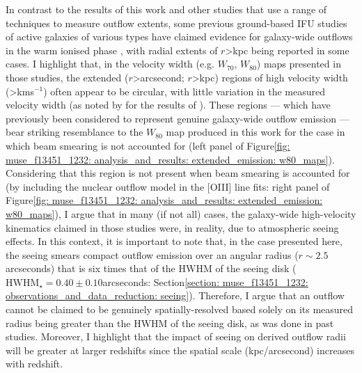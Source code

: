 In contrast to the results of this work and other studies that use a range of techniques to measure outflow extents, some previous ground-based IFU studies of active galaxies of various types have claimed evidence for galaxy-wide outflows in the warm ionised phase \citep{Liu2013, Liu2014, Harrison2014, McElroy2015}, with radial extents of $r$\;\textgreater{}\;kpc being reported in some cases. I highlight that, in the velocity width (e.g. $W_\mathrm{70}$, $W_\mathrm{80}$) maps presented in those studies, the extended ($r$\;\textgreater{}\;arcsecond; $r$\;\textgreater{}\;kpc) regions of high velocity width (\textgreater{}\;km\;s$^{-1}$) often appear to be circular, with little variation in the measured velocity width (as noted by \citealt{Husemann2016} for the results of \citealt{Liu2013, Liu2014}). These regions --- which have previously been considered to represent genuine galaxy-wide outflow emission --- bear striking resemblance to the $W_\mathrm{80}$ map produced in this work for the case in which beam smearing is not accounted for (left panel of Figure\;\ref{fig: muse_f13451_1232: analysis_and_results: extended_emission: w80_maps}). Considering that this region is not present when beam smearing is accounted for (by including the nuclear outflow model in the [OIII] line fits: right panel of Figure\;\ref{fig: muse_f13451_1232: analysis_and_results: extended_emission: w80_maps}), I argue that in many (if not all) cases, the galaxy-wide high-velocity kinematics claimed in those studies were, in reality, due to atmospheric seeing effects. In this context, it is important to note that, in the case presented here, the seeing smears compact outflow emission over an angular radius ($r\sim2.5$\;arcseconds) that is six times that of the HWHM of the seeing disk ($\mathrm{HWHM}_\star=0.40\pm0.10$\;arcseconds: Section\;\ref{section: muse_f13451_1232: observations_and_data_reduction: seeing}). Therefore, I argue that an outflow cannot be claimed to be genuinely spatially-resolved based solely on its measured radius being greater than the HWHM of the seeing disk, as was done in past studies. Moreover, I highlight that the impact of seeing on derived outflow radii will be greater at larger redshifts since the spatial scale (kpc/arcsecond) increases with redshift.

